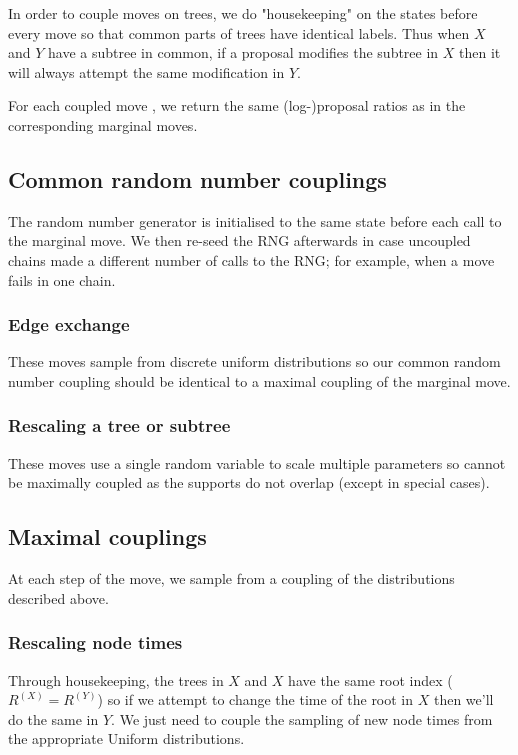 \documentclass[11pt,a4paper]{article}
\begin{document}
In order to couple moves on trees, we do "housekeeping" on the states before every move so that common parts of trees have identical labels. Thus when $ X $ and $ Y $ have a subtree in common, if a proposal modifies the subtree in $ X $ then it will always attempt the same modification in $ Y $.

For each coupled move , we return the same (log-)proposal ratios as in the corresponding marginal moves.

\subsection{Common random number couplings}

The random number generator is initialised to the same state before each call to the marginal move. We then re-seed the RNG afterwards in case uncoupled chains made a different number of calls to the RNG; for example, when a move fails in one chain.

\subsubsection{Edge exchange}

These moves sample from discrete uniform distributions so our common random number coupling should be identical to a maximal coupling of the marginal move.

\subsubsection{Rescaling a tree or subtree}

These moves use a single random variable to scale multiple parameters so cannot be maximally coupled as the supports do not overlap (except in special cases).

\subsection{Maximal couplings}

At each step of the move, we sample from a coupling of the distributions described above.

\subsubsection{Rescaling node times}

Through housekeeping, the trees in $ X $ and $ X $ have the same root index ($ R^{(X)} = R^{(Y)} $) so if we attempt to change the time of the root in $ X $ then we'll do the same in $ Y $. We just need to couple the sampling of new node times from the appropriate Uniform distributions.
\end{document}
